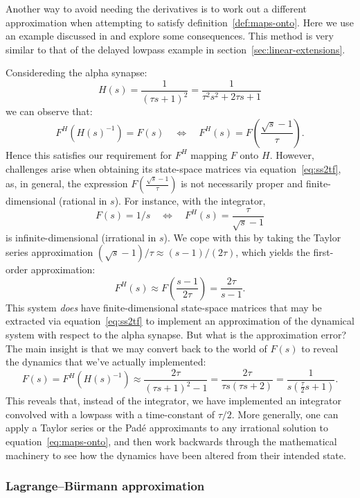 Another way to avoid needing the derivatives is to work out a different approximation when attempting to satisfy definition~\ref{def:maps-onto}.
Here we use an example discussed in \citet{dynamicspatent} and explore some consequences.
This method is very similar to that of the delayed lowpass example in section~\ref{sec:linear-extensions}.

Considereding the alpha synapse:
$$H(s) = \frac{1}{(\tau s + 1)^2} = \frac{1}{\tau^2 s^2 + 2\tau s + 1}$$
we can observe that:
$$F^H \left( H(s)^{-1} \right) = F(s) \quad \iff \quad F^H(s) = F \left( \frac{\sqrt{s} - 1}{\tau} \right) \text{.}$$
Hence this satisfies our requirement for $F^H$ mapping $F$ onto $H$.
However, challenges arise when obtaining its state-space matrices via equation~\ref{eq:ss2tf}, as,
in general, the expression $F \left( \frac{\sqrt{s} - 1}{\tau} \right)$ is not necessarily proper and finite-dimensional (rational in $s$). For instance, with the integrator,
$$F(s) = 1/s \quad \iff \quad F^H(s) = \frac{\tau}{\sqrt{s} - 1}$$
is infinite-dimensional (irrational in $s$).
We cope with this by taking the Taylor series approximation $(\sqrt{s} - 1) / \tau \approx \left( s - 1 \right) / (2 \tau)$, which yields the first-order approximation:
\begin{equation} \label{eq:taylor-integral}
F^H(s) \approx F \left( \frac{s-1}{2\tau} \right) = \frac{2 \tau}{s - 1} \text{.}
\end{equation}
This system \emph{does} have finite-dimensional state-space matrices that may be extracted via equation~\ref{eq:ss2tf} to implement an approximation of the dynamical system with respect to the alpha synapse.
But what is the approximation error?
The main insight is that we may convert back to the world of $F(s)$ to reveal the dynamics that we've actually implemented:
$$F(s) = F^H \left( H(s)^{-1} \right) \approx \frac{2\tau}{(\tau s + 1)^2 - 1} = \frac{2\tau}{\tau s (\tau s + 2)} = \frac{1}{s \left( \frac{\tau}{2} s + 1 \right) } \text{.}$$
This reveals that, instead of the integrator, we have implemented an integrator convolved with a lowpass with a time-constant of $\tau / 2$.
More generally, one can apply a Taylor series or the Pad\'e approximants to any irrational solution to equation~\ref{eq:maps-onto}, and then work backwards through the mathematical machinery to see how the dynamics have been altered from their intended state. 

\subsubsection{Lagrange--B\"urmann approximation}

